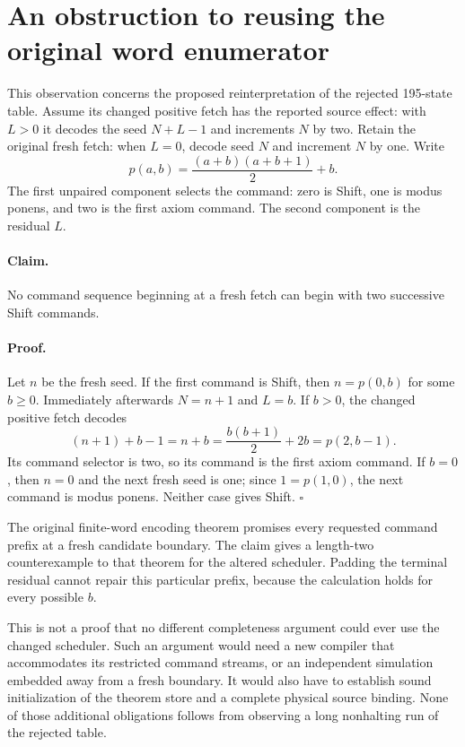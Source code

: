\section{An obstruction to reusing the original word enumerator}
\label{sec:altered-scheduler}

This observation concerns the proposed reinterpretation of the rejected
195-state table. Assume its changed positive fetch has the reported
source effect: with $L>0$ it decodes the seed $N+L-1$ and increments
$N$ by two. Retain the original fresh fetch: when $L=0$, decode seed
$N$ and increment $N$ by one. Write
\[
 p(a,b)=\frac{(a+b)(a+b+1)}2+b.
\]
The first unpaired component selects the command: zero is Shift, one is
modus ponens, and two is the first axiom command. The second component
is the residual $L$.

\paragraph{Claim.}
No command sequence beginning at a fresh fetch can begin with two
successive Shift commands.

\paragraph{Proof.}
Let $n$ be the fresh seed. If the first command is Shift, then
$n=p(0,b)$ for some $b\geq0$. Immediately afterwards $N=n+1$ and $L=b$.
If $b>0$, the changed positive fetch decodes
\[
 (n+1)+b-1=n+b
 =\frac{b(b+1)}2+2b
 =p(2,b-1).
\]
Its command selector is two, so its command is the first axiom command.
If $b=0$, then $n=0$ and the next fresh seed is one; since
$1=p(1,0)$, the next command is modus ponens. Neither case gives Shift.
\hfill$\square$

The original finite-word encoding theorem promises every requested
command prefix at a fresh candidate boundary. The claim gives a
length-two counterexample to that theorem for the altered scheduler.
Padding the terminal residual cannot repair this particular prefix,
because the calculation holds for every possible $b$.

This is not a proof that no different completeness argument could ever
use the changed scheduler. Such an argument would need a new compiler
that accommodates its restricted command streams, or an independent
simulation embedded away from a fresh boundary. It would also have to
establish sound initialization of the theorem store and a complete
physical source binding. None of those additional obligations follows
from observing a long nonhalting run of the rejected table.
